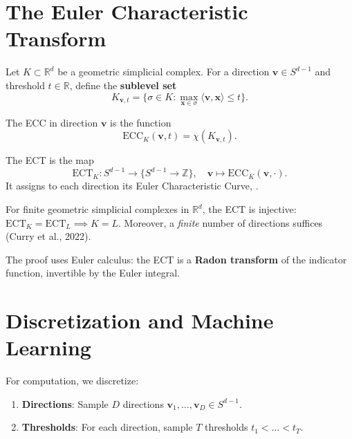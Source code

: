 \section{The Euler Characteristic Transform} \cite{rieck2025topology}
\label{sec:ect:definition}

Let $K \subset \mathbb{R}^d$ be a geometric simplicial complex. For a direction $\bm{v} \in S^{d-1}$ and threshold $t \in \mathbb{R}$, define the \textbf{sublevel set}
\[
K_{\bm{v}, t} = \{\sigma \in K : \max_{\bm{x} \in \sigma} \langle \bm{v}, \bm{x} \rangle \le t\}.
\]

\begin{definition} \cite{rieck2025topology}
The ECC in direction $\bm{v}$ is the function
\[
\mathrm{ECC}_K(\bm{v}, t) = \chi(K_{\bm{v}, t}).
\]
\end{definition}

\begin{definition} \cite{rieck2025topology}
The ECT is the map
\[
\mathrm{ECT}_K: S^{d-1} \to \{S^{d-1} \to \mathbb{Z}\}, \quad \bm{v} \mapsto \mathrm{ECC}_K(\bm{v}, \cdot).
\]
It assigns to each direction its Euler Characteristic Curve, \cite{rieck2025topology}.
\end{definition}

\begin{theorem}
\label{thm:ect:invertible}
For finite geometric simplicial complexes in $\mathbb{R}^d$, the ECT is injective: $\mathrm{ECT}_K = \mathrm{ECT}_L \implies K = L$. Moreover, a \emph{finite} number of directions suffices (Curry et al., 2022).
\end{theorem}

The proof uses Euler calculus: the ECT is a \textbf{Radon transform} of the indicator function, invertible by the Euler integral.

\section{Discretization and Machine Learning}
\label{sec:ect:discretize}

For computation, we discretize:
\begin{enumerate}
    \item \textbf{Directions}: Sample $D$ directions $\bm{v}_1,\dots,\bm{v}_D \in S^{d-1}$.
    \item \textbf{Thresholds}: For each direction, sample $T$ thresholds $t_1 < \dots < t_T$.
\end{enumerate}

